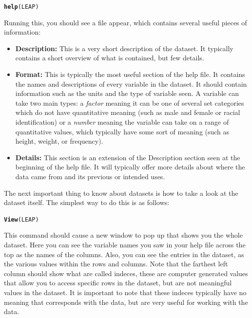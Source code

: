 \documentclass[11pt]{article}\usepackage[]{graphicx}\usepackage[]{color}
\makeatletter
\newcommand{\hlstd}[1]{\textcolor[rgb]{0.345,0.345,0.345}{#1}}%
\newcommand{\hlkwd}[1]{\textcolor[rgb]{0.737,0.353,0.396}{\textbf{#1}}}%
\newenvironment{kframe}{%
 \def\at@end@of@kframe{}%
 \ifinner\ifhmode%
  \def\at@end@of@kframe{\end{minipage}}%
  \begin{minipage}{\columnwidth}%
 \fi\fi%
 \def\FrameCommand##1{\hskip\@totalleftmargin \hskip-\fboxsep
 \colorbox{shadecolor}{##1}\hskip-\fboxsep
     \hskip-\linewidth \hskip-\@totalleftmargin \hskip\columnwidth}%
 \MakeFramed {\advance\hsize-\width
   \@totalleftmargin\z@ \linewidth\hsize
   \@setminipage}}%
 {\par\unskip\endMakeFramed%
 \at@end@of@kframe}
\newenvironment{knitrout}{}{} %
\makeatother
\begin{document}
\begin{knitrout}
\color{fgcolor}\begin{kframe}
\begin{alltt}
\hlkwd{help}\hlstd{(LEAP)}
\end{alltt}
\end{kframe}
\end{knitrout}
Running this, you should see a file appear, which contains several useful pieces of information:
\begin{itemize}
\item \textbf{Description:} This is a very short description of the dataset.  It typically contains a short overview of what is contained, but few details.
\item \textbf{Format:} This is typically the most useful section of the help file.  It contains the names and descriptions of every variable in the dataset.  It should contain information such as the units and the type of variable seen.  A variable can take two main types: a \textit{factor} meaning it can be one of several set categories which do not have quantitative meaning (such as male and female or racial identification) or a \textit{number} meaning the variable can take on a range of quantitative values, which typically have some sort of meaning (such as height, weight, or frequency).
\item \textbf{Details:} This section is an extension of the Description section seen at the beginning of the help file.  It will typically offer more details about where the data came from and its previous or intended uses.
\end{itemize}
The next important thing to know about datasets is how to take a look at the dataset itself.  The simplest way to do this is as follows:
\begin{knitrout}
\color{fgcolor}\begin{kframe}
\begin{alltt}
\hlkwd{View}\hlstd{(LEAP)}
\end{alltt}
\end{kframe}
\end{knitrout}
This command should cause a new window to pop up that shows you the whole dataset.  Here you can see the variable names you saw in your help file across the top as the names of the columns.  Also, you can see the entries in the dataset, as the various values within the rows and columns.  Note that the farthest left column should show what are called indeces, these are computer generated values that allow you to access specific rows in the dataset, but are not meaningful values in the dataset.  It is important to note that these indeces typically have no meaning that corresponds with the data, but are very useful for working with the data.
\end{document}
